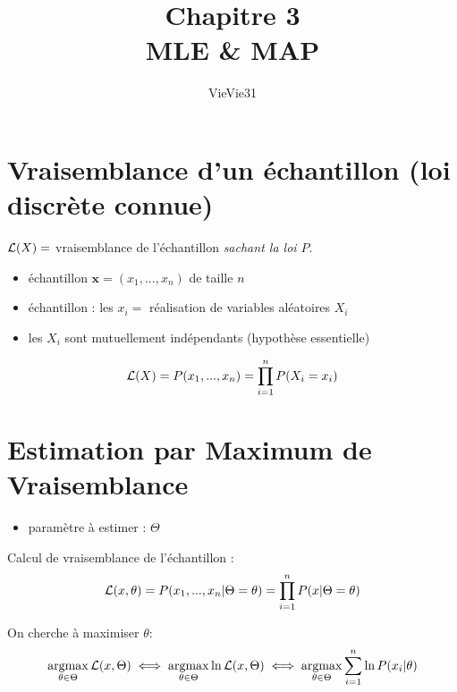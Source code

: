 \documentclass{article}
\title{Chapitre 3 \\ MLE \& MAP}
\author{VieVie31}
\begin{document}
\newtheorem{theo}{Théorème}
\newtheorem{coro}{Corollaire}

\newcommand{\argmax}{\operatornamewithlimits{argmax}}
\newcommand{\likelihood}{{\cal L}}

\maketitle


\section{Vraisemblance d'un échantillon (loi discrète connue)}
$\likelihood(X) = $ vraisemblance de l'échantillon \textit{sachant la loi $P$}.

\begin{itemize}
    \item échantillon $\textbf{x} = (x_1, ..., x_n)$ de taille $n$
    \item échantillon : les $x_i = $ réalisation de variables aléatoires $X_i$
    \item les $X_i$ sont mutuellement indépendants (hypothèse essentielle)
\end{itemize}

\begin{equation}
    \likelihood(X) = P(x_1, ..., x_n) = \prod\limits_{i=1}^n P(X_i = x_i)
\end{equation} 


\section{Estimation par Maximum de Vraisemblance}

\begin{itemize}
    \item paramètre à estimer : $\Theta$
\end{itemize}

Calcul de vraisemblance de l'échantillon :
\begin{equation}
    \likelihood(x, \theta) = P(x_1, ..., x_n | \Theta=\theta) = \prod\limits_{i=1}^n P(x | \Theta = \theta)
\end{equation}

On cherche à maximiser $\theta$:
\begin{equation}
    \argmax\limits_{\theta \in \Theta} \likelihood(x, \Theta)
    \iff \argmax\limits_{\theta \in \Theta} \ln \likelihood(x, \Theta) 
    \iff \argmax\limits_{\theta \in \Theta} \sum\limits_{i=1}^n\ln P(x_i | \theta)
\end{equation}
\end{document}
